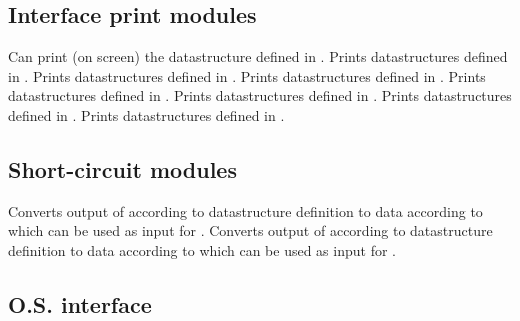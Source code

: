 \subsection{Interface print modules}

\bsc
{} Can print (on screen) the datastructure defined in
               .
   \bsc
    Prints datastructures defined in .
    Prints datastructures defined in .
    Prints datastructures defined in .
    Prints datastructures defined in .
    Prints datastructures defined in .
    Prints datastructures defined in .
    Prints datastructures defined in .
   \esc
\esc

\subsection{Short-circuit modules}

\bsc
{} Converts output of  according to datastructure
                     definition  to data according to
                      which can be used as input for
                     .
 Converts output of  according to datastructure
                     definition  to data according to
                      which can be used as input for
                     .
\esc

\subsection{O.S. interface}

